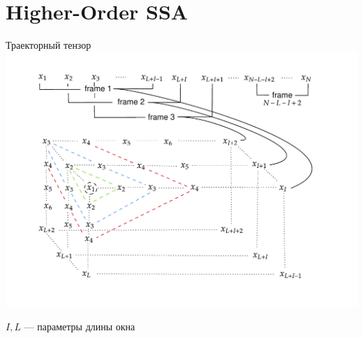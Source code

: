 \documentclass[pdf, unicode, 9pt, notheorems, handout]{beamer}
\begin{document}
    \section{Higher-Order SSA}\label{sec:ho-ssa}
    \begin{frame}{Траекторный тензор}
        \centering
        \includegraphics[width = \textwidth]{./img/tens-injection-wide}\\{}
        \vspace{-0.4cm}
        
        $I, L$ --- параметры длины окна
    \end{frame}
    
\end{document}
